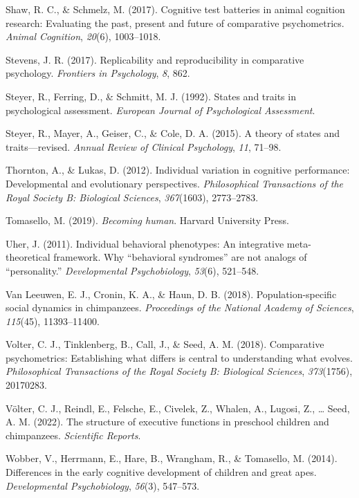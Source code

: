 \documentclass[
  man,floatsintext]{apa6}
\newlength{\cslhangindent}
\newlength{\cslentryspacingunit} %
\newenvironment{CSLReferences}[2] %
 {%
  \setlength{\parindent}{0pt}
  \ifodd #1
  \let\oldpar\par
  \def\par{\hangindent=\cslhangindent\oldpar}
  \fi
  \setlength{\parskip}{#2\cslentryspacingunit}
 }%
 {}
\begin{document}
\begin{CSLReferences}{1}{0}
\leavevmode{}%
Shaw, R. C., \& Schmelz, M. (2017). Cognitive test batteries in animal cognition research: Evaluating the past, present and future of comparative psychometrics. \emph{Animal Cognition}, \emph{20}(6), 1003--1018.

\leavevmode{}%
Stevens, J. R. (2017). Replicability and reproducibility in comparative psychology. \emph{Frontiers in Psychology}, \emph{8}, 862.

\leavevmode{}%
Steyer, R., Ferring, D., \& Schmitt, M. J. (1992). States and traits in psychological assessment. \emph{European Journal of Psychological Assessment}.

\leavevmode{}%
Steyer, R., Mayer, A., Geiser, C., \& Cole, D. A. (2015). A theory of states and traits---revised. \emph{Annual Review of Clinical Psychology}, \emph{11}, 71--98.

\leavevmode{}%
Thornton, A., \& Lukas, D. (2012). Individual variation in cognitive performance: Developmental and evolutionary perspectives. \emph{Philosophical Transactions of the Royal Society B: Biological Sciences}, \emph{367}(1603), 2773--2783.

\leavevmode{}%
Tomasello, M. (2019). \emph{Becoming human}. Harvard University Press.

\leavevmode{}%
Uher, J. (2011). Individual behavioral phenotypes: An integrative meta-theoretical framework. Why {``behavioral syndromes''} are not analogs of {``personality.''} \emph{Developmental Psychobiology}, \emph{53}(6), 521--548.

\leavevmode{}%
Van Leeuwen, E. J., Cronin, K. A., \& Haun, D. B. (2018). Population-specific social dynamics in chimpanzees. \emph{Proceedings of the National Academy of Sciences}, \emph{115}(45), 11393--11400.

\leavevmode{}%
Volter, C. J., Tinklenberg, B., Call, J., \& Seed, A. M. (2018). Comparative psychometrics: Establishing what differs is central to understanding what evolves. \emph{Philosophical Transactions of the Royal Society B: Biological Sciences}, \emph{373}(1756), 20170283.

\leavevmode{}%
Völter, C. J., Reindl, E., Felsche, E., Civelek, Z., Whalen, A., Lugosi, Z., \ldots{} Seed, A. M. (2022). The structure of executive functions in preschool children and chimpanzees. \emph{Scientific Reports}.

\leavevmode{}%
Wobber, V., Herrmann, E., Hare, B., Wrangham, R., \& Tomasello, M. (2014). Differences in the early cognitive development of children and great apes. \emph{Developmental Psychobiology}, \emph{56}(3), 547--573.

\end{CSLReferences}

\endgroup
\end{document}
